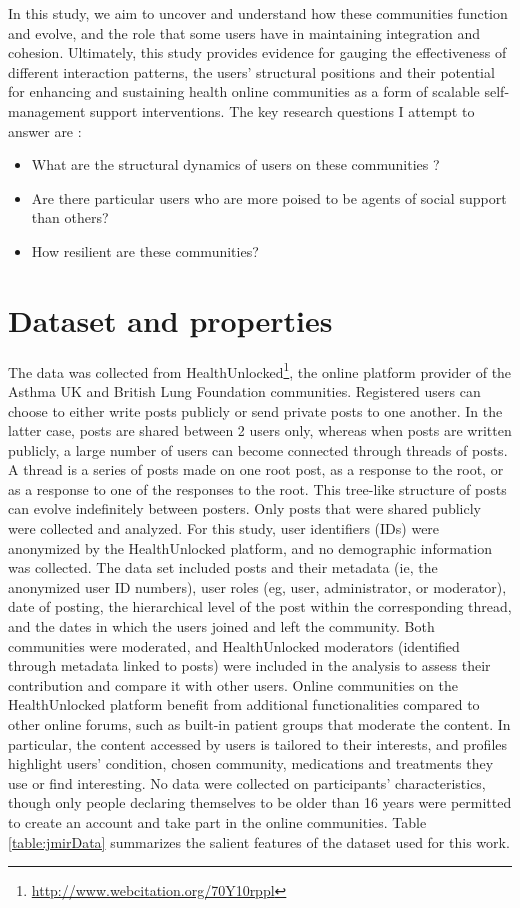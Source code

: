 In this study, we aim to uncover and understand how these communities function and evolve, and the role that some users have in maintaining integration and cohesion. Ultimately, this study provides evidence for gauging the effectiveness of different interaction patterns, the users’ structural positions and their potential for enhancing and sustaining health online communities as a form of scalable self-management support interventions. 
The key research questions I attempt to answer are : 
\begin{itemize}
    \item What are the structural dynamics of users on these communities ? 
    \item Are there particular users who are more poised to be agents of social support than others? 
    \item How resilient are these communities? 
\end{itemize}


\section{Dataset and properties}
The data was collected from HealthUnlocked\footnote{\url{http://www.webcitation.org/70Y10rppl}}, the online platform provider of the Asthma UK and British Lung Foundation communities. Registered users can choose to either write posts publicly or send private posts to one another. In the latter case, posts are shared between 2 users only, whereas when posts are written publicly, a large number of users can become connected through threads of posts. A thread is a series of posts made on one root post, as a response to the root, or as a response to one of the responses to the root. This tree-like structure of posts can evolve indefinitely between posters. 
Only posts that were shared publicly were collected and analyzed. For this study, user identifiers (IDs) were anonymized by the HealthUnlocked platform, and no demographic information was collected. 
The data set included posts and their metadata (ie, the anonymized user ID numbers), user roles (eg, user, administrator, or moderator), date of posting, the hierarchical level of the post within the corresponding thread, and the dates in which the users joined and left the community. Both communities were moderated, and HealthUnlocked moderators (identified through metadata linked to posts) were included in the analysis to assess their contribution and compare it with other users. Online communities on the HealthUnlocked platform benefit from additional functionalities compared to other online forums, such as built-in patient groups that moderate the content. In particular, the content accessed by users is tailored to their interests, and profiles highlight users’ condition, chosen community, medications and treatments they use or find interesting. No data were collected on participants’ characteristics, though only people declaring themselves to be older than 16 years were permitted to create an account and take part in the online communities. Table \ref{table:jmirData} summarizes the salient features of the dataset used for this work. 


